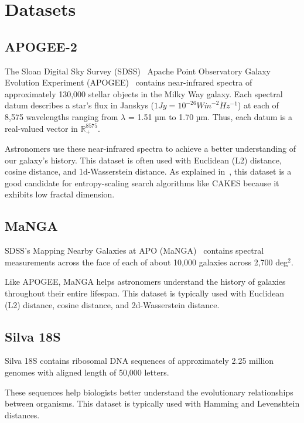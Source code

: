 
\section{Datasets}
\label{sec:datasets-and-distance-functions}

\subsection{APOGEE-2}
\label{subsec:datasets:apogee-2}
The Sloan Digital Sky Survey (SDSS)~\cite{blanton2017sdss} Apache Point Observatory Galaxy Evolution
Experiment (APOGEE)~\cite{alam2015eleventh} contains near-infrared
spectra of approximately 130,000 stellar objects in the Milky
Way galaxy. Each spectral datum describes a star's flux in
Janskys ($1 Jy = 10^{-26} W \dot m^{-2} \dot Hz^{-1}$) at each of 8,575 wavelengths ranging from $\lambda$ = 1.51 µm to 1.70 µm. 
Thus, each datum is a real-valued vector in $\mathbb{R}_{+}^{8575}$. 

Astronomers use these near-infrared spectra to achieve a better understanding of our galaxy's history. This dataset 
is often used with Euclidean (L2) distance, cosine distance, and 1d-Wasserstein distance. As explained in~\cite{ishaq2019clustered},
this dataset is a good candidate for entropy-scaling search algorithms like CAKES because it exhibits low fractal dimension. 

\subsection{MaNGA}
\label{subsec:datasets:manga}
SDSS's Mapping Nearby Galaxies at APO (MaNGA)~\cite{Talbot2022SDSSIVMA} contains spectral measurements across the face of each of 
about 10,000 galaxies across 2,700 deg$^2$. 

Like APOGEE, MaNGA helps astronomers understand the history of galaxies throughout their entire lifespan. This 
dataset is typically used with Euclidean (L2) distance, cosine distance, and 2d-Wasserstein distance. 


\subsection{Silva 18S}
\label{subsec:datasets:silva-18s}

Silva 18S contains ribosomal DNA sequences of approximately 2.25 
million genomes with aligned length of 50,000 letters. 


These sequences help biologists better understand the evolutionary relationships between organisms. 
This dataset is typically used with Hamming and Levenshtein distances. 


